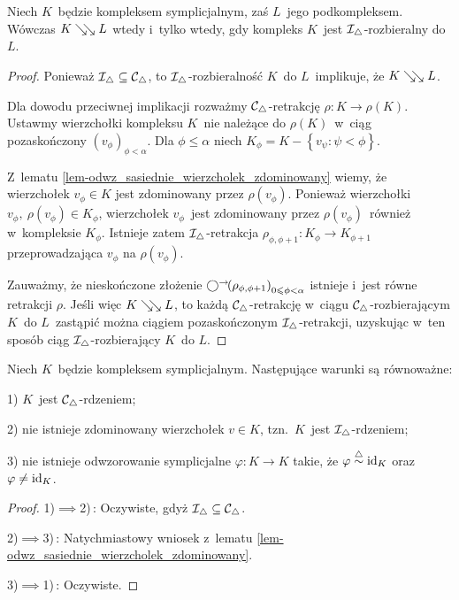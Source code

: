 \begin{lem}\label{lem-mCtriang-rozbieralnosc-wtw-mItriang-rozbieralnosc}
Niech $K$~będzie kompleksem symplicjalnym, zaś $L$~jego podkompleksem. Wówczas $K\searrow\!\!\searrow L$ wtedy i~tylko wtedy, gdy kompleks $K$~jest $\mathcal{I}_\triangle$-rozbieralny do $L$.
\end{lem}
\begin{proof}
Ponieważ $\mathcal{I}_\triangle\subseteq \mathcal{C}_\triangle$, to $\mathcal{I}_\triangle$-rozbieralność $K$~do $L$~implikuje, że $K\searrow\!\!\searrow L$.

Dla dowodu przeciwnej implikacji rozważmy $\mathcal{C}_\triangle$-retrakcję $\rho\colon K\to \rho(K)$. Ustawmy wierzchołki kompleksu $K$~nie należące do $\rho(K)$~w~ciąg pozaskończony $\left(v_\phi\right)_{\phi<\alpha}$. Dla $\phi\leq\alpha$ niech $K_\phi=K - \left\{v_\psi:\psi<\phi\right\}$.

Z~lematu \ref{lem-odwz_sasiednie_wierzcholek_zdominowany} wiemy, że wierzchołek $v_\phi\in K$ jest zdominowany przez $\rho(v_\phi)$. Ponieważ wierzchołki $v_\phi,\ \rho(v_\phi)\in K_{\phi}$, wierzchołek $v_\phi$~jest zdominowany przez $\rho(v_\phi)$~również w~kompleksie $K_\phi$. Istnieje zatem $\mathcal{I}_\triangle$-retrakcja $\rho_{\phi,\phi+1}\colon K_{\phi}\to K_{\phi+1}$ przeprowadzająca $v_\phi$ na $\rho(v_\phi)$.

Zauważmy, że nieskończone złożenie $\bigcirc^\rightarrow\!\!\left(\rho_{\phi,\phi+1}\right)_{0\leqslant\phi<\alpha}$ istnieje i~jest równe retrakcji $\rho$. Jeśli więc $K\searrow\!\!\searrow L$, to każdą $\mathcal{C}_\triangle$-retrakcję w~ciągu $\mathcal{C}_\triangle$-rozbierającym $K$~do $L$~zastąpić można ciągiem pozaskończonym $\mathcal{I}_\triangle$-retrakcji, uzyskując w~ten sposób ciąg $\mathcal{I}_\triangle$-rozbierający $K$~do $L$.
\end{proof}

\begin{lem}\label{lem-Ctriang-rdzenie-charakteryzacja}
Niech $K$~będzie kompleksem symplicjalnym. Następujące warunki są równoważne:
\begin{compactitem}
\item[1)] $K$~jest $\mathcal{C}_\triangle$-rdzeniem;
\item[2)] nie istnieje zdominowany wierzchołek $v\in K$, tzn.~$K$~jest $\mathcal{I}_\triangle$-rdzeniem;
\item[3)] nie istnieje odwzorowanie symplicjalne $\varphi\colon K\to K$ takie, że $\varphi\stackrel{\triangle}{\sim}\operatorname{id}_K$ oraz $\varphi\not=\operatorname{id}_K$.
\end{compactitem}
\end{lem}
\begin{proof}
1)$\implies$2)\,: Oczywiste, gdyż $\mathcal{I}_\triangle\subseteq \mathcal{C}_\triangle$.

2)$\implies$3)\,: Natychmiastowy wniosek z~lematu \ref{lem-odwz_sasiednie_wierzcholek_zdominowany}.

3)$\implies$1)\,: Oczywiste.
\end{proof} 

